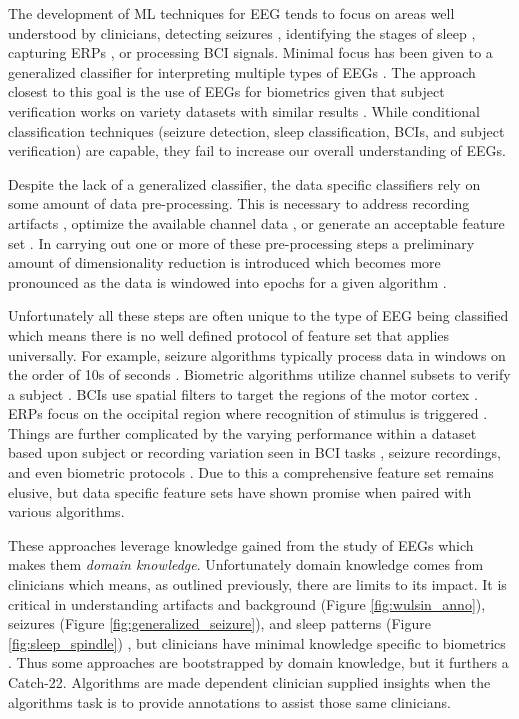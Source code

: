 The development of \ac{ML} techniques for \ac{EEG} tends to focus on areas well understood by clinicians, detecting seizures \cite{Chu2017,Wulsin2011}, identifying the stages of sleep \cite{Schluter2012,Hassan2016}, capturing \acp{ERP} \cite{Makeig2012,Guntekin2016}, or processing \ac{BCI} signals. Minimal focus has been given to a generalized classifier for interpreting multiple types of \acp{EEG} \cite{Vidaurre2011}. The approach closest to this goal is the use of \acp{EEG} for biometrics given that subject verification works on variety datasets with similar results \cite{Paranjape2001,Palaniappan2007a,Yang2016}. While conditional classification techniques (seizure detection, sleep classification, \acp{BCI}, and subject verification) are capable, they fail to increase our overall understanding of \acp{EEG}.

Despite the lack of a generalized classifier, the data specific classifiers rely on some amount of data pre-processing. This is necessary to address recording artifacts \cite{Lawhern2016,Mahajan2015,Minguillon2017}, optimize the available channel data \cite{Rocca2014}, or generate an acceptable feature set \cite{Su2018}.  In carrying out one or more of these pre-processing steps a preliminary amount of dimensionality reduction is introduced which becomes more pronounced as the data is windowed into epochs for a given algorithm \cite{Gross2014,Lotte2007b,Subasi2010}. 

Unfortunately all these steps are often unique to the type of \ac{EEG} being classified which means there is no well defined protocol of feature set that applies universally. For example, seizure algorithms typically process data in windows on the order of 10s of seconds \cite{Wang2016}. Biometric algorithms utilize channel subsets to verify a subject \cite{Campisi2014}. \acp{BCI} use spatial filters to target the regions of the motor cortex \cite{Schalk2004}. \acp{ERP} focus on the occipital region where recognition of stimulus is triggered \cite{Kindermans2014b}. Things are further complicated by the varying performance within a dataset based upon subject or recording variation seen in \ac{BCI} tasks \cite{Gross2014,Blankertz2007a,Kang2014b}, seizure recordings\cite{Ramgopal2014,Wulsin2011,Page2015}, and even biometric protocols \cite{Armstrong2015,Maiorana2016}. Due to this a comprehensive feature set remains elusive, but data specific feature sets have shown promise when paired with various algorithms.

These approaches leverage knowledge gained from the study of \acp{EEG} which makes them \emph{domain knowledge}. Unfortunately domain knowledge comes from clinicians which means, as outlined previously, there are limits to its impact. It is critical in understanding artifacts and background (Figure \ref{fig:wulsin_anno}), seizures (Figure \ref{fig:generalized_seizure}), and sleep patterns (Figure \ref{fig:sleep_spindle}) \cite{Bodizs2009,Wendt2012}, but clinicians have minimal knowledge specific to biometrics \cite{Paranjape2001}. Thus some approaches are bootstrapped by domain knowledge, but it furthers a Catch-22. Algorithms are made dependent clinician supplied insights when the algorithms task is to provide annotations to assist those same clinicians.

